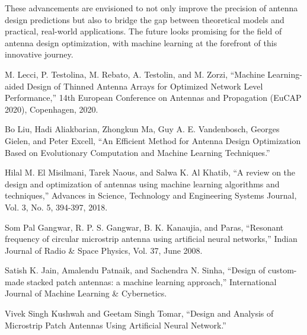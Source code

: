 \documentclass[a4paper,12pt]{report}
\begin{document}
These advancements are envisioned to not only improve the precision of antenna design predictions but also to bridge the gap between theoretical models and practical, real-world applications. The future looks promising for the field of antenna design optimization, with machine learning at the forefront of this innovative journey.


\pagebreak

\begin{thebibliography}{99}
M. Lecci, P. Testolina, M. Rebato, A. Testolin, and M. Zorzi,
\newblock ``Machine Learning-aided Design of Thinned Antenna Arrays for Optimized Network Level Performance,''
\newblock 14th European Conference on Antennas and Propagation (EuCAP 2020), Copenhagen, 2020.

Bo Liu, Hadi Aliakbarian, Zhongkun Ma, Guy A. E. Vandenbosch, Georges Gielen, and Peter Excell,
\newblock ``An Efficient Method for Antenna Design Optimization Based on Evolutionary Computation and Machine Learning Techniques.''

Hilal M. El Misilmani, Tarek Naous, and Salwa K. Al Khatib,
\newblock ``A review on the design and optimization of antennas using machine learning algorithms and techniques,''
\newblock Advances in Science, Technology and Engineering Systems Journal, Vol. 3, No. 5, 394-397, 2018.

Som Pal Gangwar, R. P. S. Gangwar, B. K. Kanaujia, and Paras,
\newblock ``Resonant frequency of circular microstrip antenna using artificial neural networks,''
\newblock Indian Journal of Radio & Space Physics, Vol. 37, June 2008.

Satish K. Jain, Amalendu Patnaik, and Sachendra N. Sinha,
\newblock ``Design of custom-made stacked patch antennas: a machine learning approach,''
\newblock International Journal of Machine Learning & Cybernetics.

Vivek Singh Kushwah and Geetam Singh Tomar,
\newblock ``Design and Analysis of Microstrip Patch Antennas Using Artificial Neural Network.''


\end{thebibliography}
\end{document}
